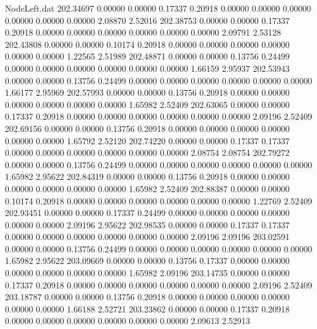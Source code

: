 \begin{filecontents}{NodeLeft.dat}
 202.34697    0.00000    0.00000     0.17337    0.20918    0.00000    0.00000    0.00000    0.00000    0.00000    0.00000    2.08870    2.52016
 202.38753    0.00000    0.00000     0.17337    0.20918    0.00000    0.00000    0.00000    0.00000    0.00000    0.00000    2.09791    2.53128
 202.43808    0.00000    0.00000     0.10174    0.20918    0.00000    0.00000    0.00000    0.00000    0.00000    0.00000    1.22565    2.51989
 202.48871    0.00000    0.00000     0.13756    0.24499    0.00000    0.00000    0.00000    0.00000    0.00000    0.00000    1.66159    2.95937
 202.53943    0.00000    0.00000     0.13756    0.24499    0.00000    0.00000    0.00000    0.00000    0.00000    0.00000    1.66177    2.95969
 202.57993    0.00000    0.00000     0.13756    0.20918    0.00000    0.00000    0.00000    0.00000    0.00000    0.00000    1.65982    2.52409
 202.63065    0.00000    0.00000     0.17337    0.20918    0.00000    0.00000    0.00000    0.00000    0.00000    0.00000    2.09196    2.52409
 202.69156    0.00000    0.00000     0.13756    0.20918    0.00000    0.00000    0.00000    0.00000    0.00000    0.00000    1.65792    2.52120
 202.74220    0.00000    0.00000     0.17337    0.17337    0.00000    0.00000    0.00000    0.00000    0.00000    0.00000    2.08754    2.08754
 202.79272    0.00000    0.00000     0.13756    0.24499    0.00000    0.00000    0.00000    0.00000    0.00000    0.00000    1.65982    2.95622
 202.84319    0.00000    0.00000     0.13756    0.20918    0.00000    0.00000    0.00000    0.00000    0.00000    0.00000    1.65982    2.52409
 202.88387    0.00000    0.00000     0.10174    0.20918    0.00000    0.00000    0.00000    0.00000    0.00000    0.00000    1.22769    2.52409
 202.93451    0.00000    0.00000     0.17337    0.24499    0.00000    0.00000    0.00000    0.00000    0.00000    0.00000    2.09196    2.95622
 202.98535    0.00000    0.00000     0.17337    0.17337    0.00000    0.00000    0.00000    0.00000    0.00000    0.00000    2.09196    2.09196
 203.02591    0.00000    0.00000     0.13756    0.24499    0.00000    0.00000    0.00000    0.00000    0.00000    0.00000    1.65982    2.95622
 203.09669    0.00000    0.00000     0.13756    0.17337    0.00000    0.00000    0.00000    0.00000    0.00000    0.00000    1.65982    2.09196
 203.14735    0.00000    0.00000     0.17337    0.20918    0.00000    0.00000    0.00000    0.00000    0.00000    0.00000    2.09196    2.52409
 203.18787    0.00000    0.00000     0.13756    0.20918    0.00000    0.00000    0.00000    0.00000    0.00000    0.00000    1.66188    2.52721
 203.23862    0.00000    0.00000     0.17337    0.20918    0.00000    0.00000    0.00000    0.00000    0.00000    0.00000    2.09613    2.52913

\end{filecontents}
